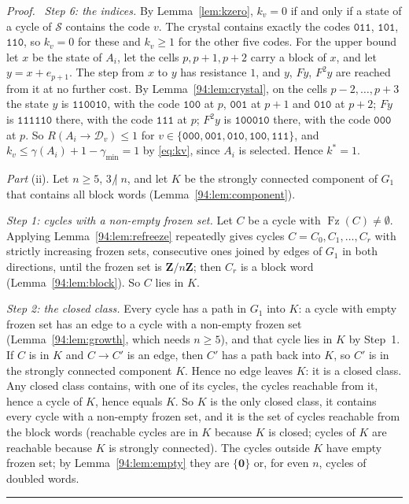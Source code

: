 \documentclass[10pt,a4paper]{article}
\newcommand{\qedmark}{\rule{1.1ex}{1.1ex}}
\newenvironment{proof}[1][Proof]{\par\smallskip\noindent\textit{#1.}\ }{\hfill\qedmark\par\smallskip}
\newcommand{\Zn}{\mathbf{Z}/n\mathbf{Z}}      %
\newcommand{\zero}{\mathbf{0}}                %
\newcommand{\gmin}{\gamma_{\min}}
\newcommand{\Sel}{\mathcal{S}}                %
\newcommand{\Gone}{G_1}                       %
\newcommand{\Dc}[1]{\mathcal{D}_{#1}}         %
\newcommand{\kst}{k^{*}}
\newcommand{\code}[1]{\mathtt{#1}}            %
\newcommand{\ndiv}{\mathrel{\not|}}           %
\newcommand{\Fz}{\operatorname{Fz}}           %
\begin{document}
\begin{proof}
\emph{Step 6: the indices.} By Lemma~\ref{lem:kzero}, $k_v=0$ if and only if a state of a cycle of $\Sel$
contains the code $v$. The crystal contains exactly the codes $\code{011}$, $\code{101}$, $\code{110}$, so $k_v=0$
for these and $k_v\ge1$ for the other five codes. For the upper bound let $x$ be the state of $A_i$, let the cells
$p,p+1,p+2$ carry a block of $x$, and let $y=x+e_{p+1}$. The step from $x$ to $y$ has resistance $1$, and $y$,
$Fy$, $F^2y$ are reached from it at no further cost. By Lemma~\ref{94:lem:crystal}, on the cells
$p-2,\dots,p+3$ the state $y$ is $\code{110010}$, with the code $\code{100}$ at $p$, $\code{001}$ at $p+1$ and
$\code{010}$ at $p+2$; $Fy$ is $\code{111110}$ there, with the code $\code{111}$ at $p$; $F^2y$ is
$\code{100010}$ there, with the code $\code{000}$ at $p$. So $R(A_i\to\Dc{v})\le1$ for
$v\in\{\code{000},\code{001},\code{010},\code{100},\code{111}\}$, and
$k_v\le\gamma(A_i)+1-\gmin=1$ by \eqref{eq:kv}, since $A_i$ is selected. Hence $\kst=1$.

\emph{Part} (ii). Let $n\ge5$, $3\ndiv n$, and let $K$ be the strongly connected component of $\Gone$ that
contains all block words (Lemma~\ref{94:lem:component}).

\emph{Step 1: cycles with a non-empty frozen set.} Let $C$ be a cycle with $\Fz(C)\ne\emptyset$. Applying
Lemma~\ref{94:lem:refreeze} repeatedly gives cycles $C=C_0,C_1,\dots,C_r$ with strictly increasing frozen sets,
consecutive ones joined by edges of $\Gone$ in both directions, until the frozen set is $\Zn$; then $C_r$ is a
block word (Lemma~\ref{94:lem:block}). So $C$ lies in $K$.

\emph{Step 2: the closed class.} Every cycle has a path in $\Gone$ into $K$: a cycle with empty frozen set has an
edge to a cycle with a non-empty frozen set (Lemma~\ref{94:lem:growth}, which needs $n\ge5$), and that cycle lies
in $K$ by Step~1. If $C$ is in $K$ and $C\to C'$ is an edge, then $C'$ has a path back into $K$, so $C'$ is in
the strongly connected component $K$. Hence no edge leaves $K$: it is a closed class. Any closed class contains,
with one of its cycles, the cycles reachable from it, hence a cycle of $K$, hence equals $K$. So $K$ is the only
closed class, it contains every cycle with a non-empty frozen set, and it is the set of cycles reachable from the
block words (reachable cycles are in $K$ because $K$ is closed; cycles of $K$ are reachable because $K$ is
strongly connected). The cycles outside $K$ have empty frozen set; by Lemma~\ref{94:lem:empty} they are
$\{\zero\}$ or, for even $n$, cycles of doubled words.


\end{proof}
\end{document}
